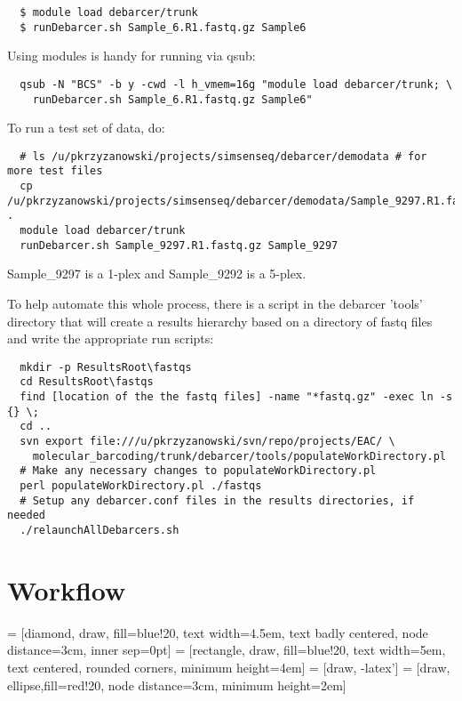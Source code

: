 \documentclass{article}
\begin{document}
\begin{verbatim}
  $ module load debarcer/trunk
  $ runDebarcer.sh Sample_6.R1.fastq.gz Sample6
\end{verbatim}

Using modules is handy for running via qsub:

\begin{verbatim}
  qsub -N "BCS" -b y -cwd -l h_vmem=16g "module load debarcer/trunk; \ 
	runDebarcer.sh Sample_6.R1.fastq.gz Sample6"
\end{verbatim}

To run a test set of data, do:

\begin{verbatim}
  # ls /u/pkrzyzanowski/projects/simsenseq/debarcer/demodata # for more test files
  cp /u/pkrzyzanowski/projects/simsenseq/debarcer/demodata/Sample_9297.R1.fastq.gz .
  module load debarcer/trunk
  runDebarcer.sh Sample_9297.R1.fastq.gz Sample_9297
\end{verbatim}

Sample\_9297 is a 1-plex and Sample\_9292 is a 5-plex.


To help automate this whole process, there is a script in the 
debarcer 'tools' directory that will create a results hierarchy based on a
directory of fastq files and write the appropriate run scripts:

\begin{verbatim}
  mkdir -p ResultsRoot\fastqs
  cd ResultsRoot\fastqs
  find [location of the the fastq files] -name "*fastq.gz" -exec ln -s {} \;
  cd ..
  svn export file:///u/pkrzyzanowski/svn/repo/projects/EAC/ \ 
	molecular_barcoding/trunk/debarcer/tools/populateWorkDirectory.pl
  # Make any necessary changes to populateWorkDirectory.pl
  perl populateWorkDirectory.pl ./fastqs
  # Setup any debarcer.conf files in the results directories, if needed
  ./relaunchAllDebarcers.sh
\end{verbatim}



\section{Workflow}

\tikzstyle{decision} = [diamond, draw, fill=blue!20, 
    text width=4.5em, text badly centered, node distance=3cm, inner sep=0pt]
\tikzstyle{block} = [rectangle, draw, fill=blue!20, 
    text width=5em, text centered, rounded corners, minimum height=4em]
\tikzstyle{line} = [draw, -latex']
\tikzstyle{cloud} = [draw, ellipse,fill=red!20, node distance=3cm,
    minimum height=2em]
\end{document}

